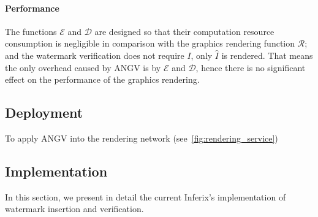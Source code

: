 
\paragraph[Performance]{Performance}
The functions $\mathcal{E}$ and $\mathcal{D}$ are designed so that their computation resource consumption is negligible in comparison with the graphics rendering function $\mathcal{R}$; and the watermark verification does not require $I$, only $\hat{I}$ is rendered. That means the only overhead caused by ANGV is by $\mathcal{E}$ and $\mathcal{D}$, hence there is no significant effect on the performance of the graphics rendering.

\subsection[Deployment]{Deployment}
To apply ANGV into the rendering network (see~\autoref{fig:rendering_service})
 

\subsection[Implementation]{Implementation}
In this section, we present in detail the current Inferix's implementation of watermark insertion and verification.



